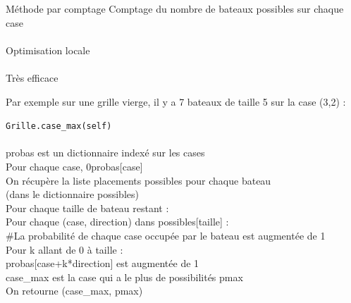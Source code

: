 \begin{frame}{Méthode par comptage}
Comptage du nombre de bateaux possibles sur chaque case\\~\\ \pause
Optimisation locale\\~\\ \pause
Très efficace 
\end{frame}

\begin{frame}
Par exemple sur une grille vierge, il y a 7 bateaux de taille 5 sur la case (3,2) :
%
\begin{center}
\end{center}
\end{frame}



{
\begin{frame}[allowframebreaks]
\texttt{Grille.case\_max(self)} \\~\\
probas est un dictionnaire indexé sur les cases\\
Pour chaque case, 0\sto probas[case]\\
On récupère la liste placements possibles pour chaque bateau\\
 (dans le dictionnaire possibles)\\
Pour chaque taille de bateau restant :\\
Pour chaque (case, direction) dans possibles[taille] :\\
\#La probabilité de chaque case occupée par le bateau est augmentée de 1\\
Pour k allant de 0 à taille :\\
probas[case+k*direction] est augmentée de 1\\
case\_max est la case qui a le plus de possibilités pmax\\
On retourne (case\_max, pmax)\\
\end{frame}
}


